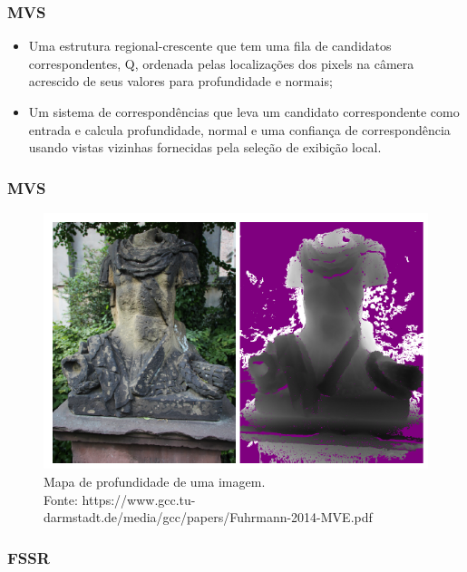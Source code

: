 \documentclass[table, usenames, svgnames, xcolor=dvipsnames]{beamer}
\begin{document}
\begin{frame} 
\frametitle{\textbf{MVS}}
	\begin{center}
		\begin{itemize}
			\item {Uma estrutura regional-crescente que tem uma fila de candidatos correspondentes, Q, ordenada pelas localizações dos pixels na câmera acrescido de seus valores para profundidade e normais;}
	\item {Um sistema de correspondências que leva um candidato correspondente como entrada e calcula profundidade, normal e uma confiança de correspondência usando vistas vizinhas fornecidas pela seleção de exibição local.}
		\end{itemize}
	\end{center}
\end{frame}

\begin{frame}
\frametitle{\textbf{MVS}}
	\begin{center}
		\begin{figure}
			\centering
			\includegraphics[width=0.8\linewidth]{figs/mvedepth.png}
			\caption{
			Mapa de profundidade de uma imagem. \\
			\tiny{Fonte: https://www.gcc.tu-darmstadt.de/media/gcc/papers/Fuhrmann-2014-MVE.pdf}
			}
		\end{figure}
	 	
	\end{center}
\end{frame}

\subsubsection{FSSR}
\end{document}

